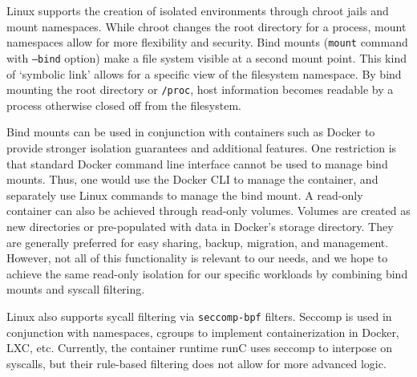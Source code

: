 \documentclass{proc}
\begin{document}
Linux supports the creation of isolated environments through chroot jails and mount namespaces. While chroot changes the root directory for a process, mount namespaces allow for more flexibility and security. Bind mounts (\texttt{mount} command with \texttt{--bind} option) make a file system visible at a second mount point\cite{bindmount}. This kind of `symbolic link' allows for a specific view of the filesystem namespace. By bind mounting the root directory or \texttt{/proc}, host information becomes readable by a process otherwise closed off from the filesystem.

Bind mounts can be used in conjunction with containers such as Docker to provide stronger isolation guarantees and additional features\cite{dockerdoc}. One restriction is that standard Docker command line interface cannot be used to manage bind mounts. Thus, one would use the Docker CLI to manage the container, and separately use Linux commands to manage the bind mount. A read-only container can also be achieved through read-only volumes. Volumes are created as new directories or pre-populated with data in Docker's storage directory. They are generally preferred for easy sharing, backup, migration, and management. However, not all of this functionality is relevant to our needs, and we hope to achieve the same read-only isolation for our specific workloads by combining bind mounts and syscall filtering.

Linux also supports sycall filtering via \texttt{seccomp-bpf} filters. Seccomp is used in conjunction with namespaces, cgroups to implement containerization in Docker, LXC, etc. Currently, the container runtime runC uses seccomp to interpose on syscalls, but their rule-based filtering does not allow for more advanced logic.


\end{document}
